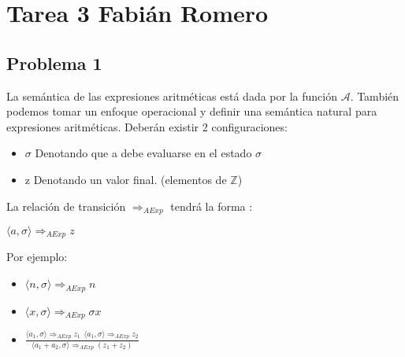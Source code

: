 \documentclass[12pt]{report}
\begin{document}

\begin{coqdoccode}
\end{coqdoccode}
\section{Tarea 3 Fabián Romero}

\begin{coqdoccode}
\coqdocemptyline
\coqdocemptyline
\end{coqdoccode}
\subsection{Problema 1}



La semántica de las expresiones aritméticas está dada por la función $\mathcal{A}$. También podemos tomar un enfoque operacional y definir una semántica natural para expresiones aritméticas.
Deberán existir 2 configuraciones:



\begin{itemize}
\item  $\sigma$ Denotando que a debe evaluarse en el estado $\sigma$

\item  z Denotando un valor final. (elementos de $\mathbb{Z}$)

\end{itemize}


La relación de transición $\Rightarrow_{AExp}$ tendrá la forma :


$\langle a, \sigma \rangle \Rightarrow_{AExp} z$


Por ejemplo:



\begin{itemize}
\item  $\langle  n, \sigma \rangle \Rightarrow_{AExp} n $

\item  $\langle x, \sigma \rangle \Rightarrow_{AExp} \sigma x$

\item  $\frac{\langle a_1 , \sigma \rangle \Rightarrow_{AExp} z_1 \>\> \langle a_1 , \sigma \rangle \Rightarrow_{AExp} z_2}{ \langle a_1 + a_2 , \sigma \rangle \Rightarrow_{AExp}(z_1+z_2) }$

\end{itemize}
\end{document}
